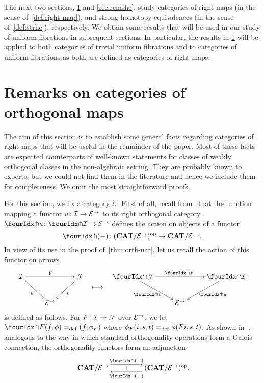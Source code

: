 \documentclass[reqno,10pt,a4paper,oneside,draft]{amsart}
\begin{document}
The next two sections, \cref{sec:ortf} and \cref{sec:remshe}, study categories of right maps (in the sense of~\cref{def:right-map}), and strong homotopy equivalences (in the sense of~\cref{def:strhe}), respectively.
We obtain some results that will be used in our study of uniform fibrations in subsequent sections.
In particular, the results in \cref{sec:ortf} will be applied to both categories of trivial uniform fibrations and to categories of uniform fibrations as both are defined as categories of right maps.


\section{Remarks on categories of orthogonal maps}
\label{sec:ortf}

The aim of this section is to establish some general facts regarding categories of right maps that will be useful in the remainder of the paper.
Most of these facts are expected counterparts of well-known statements for classes of weakly orthogonal classes in the non-algebraic setting.
They are probably known to experts, but we could not find them in the literature and hence we include them for completeness.
We omit the most straightforward proofs.

For this section, we fix a category $\mathcal{E}$.
First of all, recall from~\cite{garner:small-object-argument} that the function mapping a functor $u \colon \mathcal{I} \to \mathcal{E}^\to$ to its right orthogonal category $\liftr{u} \co \liftr{\cal{I}} \to \catE^\to$ defines the action on objects of a functor
\[
  \liftr{\brarghole} \co (\CAT/\catE^\to)^{\op} \to \CAT/\catE^\to \, .
\]
In view of its use in the proof of~\cref{thm:orth-nat}, let us recall the action of this functor on arrows
\begin{align*}
\xymatrix{
  \cal{I}
  \ar[dr]_{u}
  \ar[rr]^{F}
&&
  \cal{J}
  \ar[dl]^{v}
\\&
  \catE^\to
}
&&
\xymatrix{
  \ar@{}[d]|{\textstyle\longmapsto} \\
  {}
}
&&
\xymatrix{
  \liftr{\cal{J}}
  \ar[dr]_{\liftr{v}}
  \ar[rr]^{\liftr{F}}
&&
  \liftr{\cal{I}}
  \ar[dl]^{\liftr{u}}
\\&
  \catE^\to
}
\end{align*}
is defined as follows.
For $F \colon \mathcal{I} \to \mathcal{J}$ over $\mathcal{E}^\to$, we let $\liftr{F}(f,\phi) \defeq (f, \phi_F)$ where $\phi_F(i, s, t) =_{\operatorname{def}} \phi(Fi, s, t)$.
As shown in~\cite[Proposition~3.8]{garner:small-object-argument}, analogous to the way in which standard orthogonality operations form a Galois connection, the orthogonality functors form an adjunction
\begin{equation} \label{garner-adjunction}
\begin{gathered}
\xymatrix@C+2em{
  \CAT/\catE^\to
  \ar@<5pt>[r]^-{\liftl{\brarghole}}
  \ar@{}[r]|-{\bot}
&
  (\CAT/\catE^\to)^{\op} \rlap{.}
  \ar@<5pt>[l]^-{\liftr{\brarghole}}
}
\end{gathered}
\end{equation}
\end{document}
